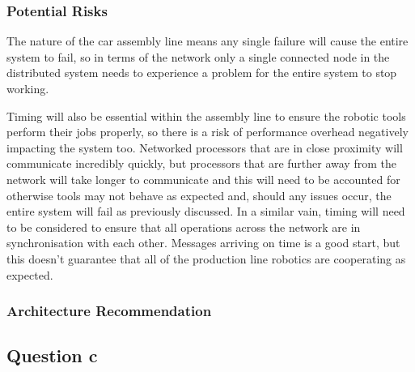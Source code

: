 \documentclass[]{report}
\begin{document}
				\subsubsection{Potential Risks}
				The nature of the car assembly line means any single failure will cause the entire system to fail, so in terms of the network only a single connected node in the distributed system needs to experience a problem for the entire system to stop working. 
				
				Timing will also be essential within the assembly line to ensure the robotic tools perform their jobs properly, so there is a risk of performance overhead negatively impacting the system too. Networked processors that are in close proximity will communicate incredibly quickly, but processors that are further away from the network will take longer to communicate and this will need to be accounted for otherwise tools may not behave as expected and, should any issues occur, the entire system will fail as previously discussed. In a similar vain, timing will need to be considered to ensure that all operations across the network are in synchronisation with each other. Messages arriving on time is a good start, but this doesn't guarantee that all of the production line robotics are cooperating as expected.
				
				\subsubsection{Architecture Recommendation}
				
				
			
			
			\subsection{Question c}
\end{document}
